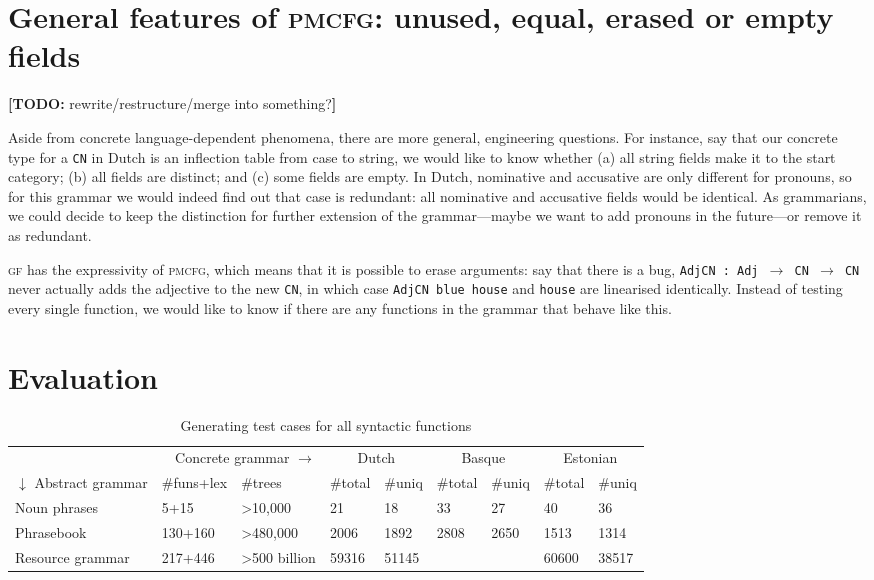 \documentclass[11pt]{article}
\def\t#1{\texttt{#1}}
\def\gf{\textsc{gf}}
\def\pmcfg{\textsc{pmcfg}}
\newcommand{\todo}[1]{{\color{cyan}\textbf{[TODO: }#1\textbf{]}}}
\begin{document}
\section{General features of \pmcfg: unused, equal,
  erased or empty fields}

\todo{rewrite/restructure/merge into something?}

Aside from concrete language-dependent phenomena, there are more
general, engineering questions. For instance, say that our
concrete type for a \t{CN} in Dutch is an inflection table from case
to string, we would like to know whether (a) all string fields make it to
the start category; (b) all fields are distinct; and (c) some fields
are empty. In Dutch, nominative and accusative are only different for
pronouns, so for this grammar we would indeed find out that case is
redundant: all nominative and accusative fields would be
identical. As grammarians, we could decide to keep the distinction for
further extension of the grammar---maybe we want to add pronouns in
the future---or remove it as redundant.

\gf{} has the expressivity of \pmcfg{}, which means that it is
possible to erase arguments: say that there is a bug, \t{AdjCN : Adj
  $\rightarrow$ CN  $\rightarrow$ CN} never actually adds the
adjective to the new \t{CN}, in which case \t{AdjCN blue house} and
\t{house} are linearised identically. Instead of testing every single
function, we would like to know if there are any functions in the
grammar that behave like this.
\section{Evaluation}

\begin{table}[]
\centering
\begin{tabular}{|lll|ll|ll|ll|}
\hline
\multicolumn{3}{|r}{Concrete grammar $\rightarrow$}             & \multicolumn{2}{|c}{Dutch} & \multicolumn{2}{|c}{Basque} & \multicolumn{2}{|c|}{Estonian} \\
$\downarrow$ Abstract grammar & \#funs+lex & \#trees                       &
                                                                 \#total     & \#uniq    & \#total     & \#uniq     & \#total      & \#uniq      \\ \hline
Noun phrases     & 5+15          & \textgreater{}10,000          & 21          & 18          & 33          & 27           & 40           & 36            \\
Phrasebook       & 130+160         & \textgreater{}480,000         & 2006        & 1892        & 2808        & 2650         & 1513         & 1314          \\
Resource grammar & 217+446         & \textgreater{}500 billion & 59316       & 51145       &             &              & 60600        & 38517        \\
\hline
\end{tabular}
\caption{Generating test cases for all syntactic functions}
\label{results}
\end{table}
\end{document}
